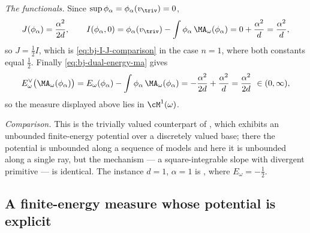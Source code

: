 \begin{example}
\emph{The functionals.}  Since $\sup\phi_\alpha=\phi_\alpha(v_{\triv})=0$,
\[
 J(\phi_\alpha)=\frac{\alpha^2}{2d},
 \qquad
 I(\phi_\alpha,0)=\phi_\alpha(v_{\triv})
   -\int\phi_\alpha\,\MA_\omega(\phi_\alpha)
 =0+\frac{\alpha^2}{d}
 =\frac{\alpha^2}{d},
\]
so $J=\tfrac12I$, which is \eqref{eq:bj-I-J-comparison} in the case
$n=1$, where both constants equal $\tfrac12$.  Finally
\eqref{eq:bj-dual-energy-ma} gives
\[
 E^\vee_\omega\bigl(\MA_\omega(\phi_\alpha)\bigr)
 =E_\omega(\phi_\alpha)-\int\phi_\alpha\,\MA_\omega(\phi_\alpha)
 =-\frac{\alpha^2}{2d}+\frac{\alpha^2}{d}
 =\frac{\alpha^2}{2d}\ \in(0,\infty),
\]
so the measure displayed above lies in $\cM^1(\omega)$.

\emph{Comparison.}  This is the trivially valued counterpart of
, which exhibits an unbounded
finite-energy potential over a discretely valued base; there the potential
is unbounded along a sequence of models and here it is unbounded along a
single ray, but the mechanism --- a square-integrable slope with divergent
primitive --- is identical.  The instance $d=1$, $\alpha=1$ is
, where $E_\omega=-\tfrac12$.
\end{example}

\subsection{A finite-energy measure whose potential is explicit}
\label{sec:ch47-ex-measure}

